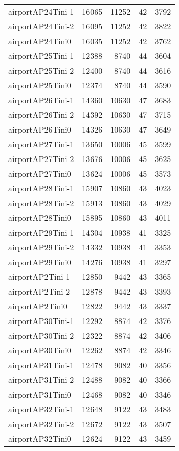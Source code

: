 \begin{tabular}{lrrrr}
airportAP24Tini-1 & 16065 & 11252 & 42 & 3792 \\
airportAP24Tini-2 & 16095 & 11252 & 42 & 3822 \\
airportAP24Tini0 & 16035 & 11252 & 42 & 3762 \\
airportAP25Tini-1 & 12388 & 8740 & 44 & 3604 \\
airportAP25Tini-2 & 12400 & 8740 & 44 & 3616 \\
airportAP25Tini0 & 12374 & 8740 & 44 & 3590 \\
airportAP26Tini-1 & 14360 & 10630 & 47 & 3683 \\
airportAP26Tini-2 & 14392 & 10630 & 47 & 3715 \\
airportAP26Tini0 & 14326 & 10630 & 47 & 3649 \\
airportAP27Tini-1 & 13650 & 10006 & 45 & 3599 \\
airportAP27Tini-2 & 13676 & 10006 & 45 & 3625 \\
airportAP27Tini0 & 13624 & 10006 & 45 & 3573 \\
airportAP28Tini-1 & 15907 & 10860 & 43 & 4023 \\
airportAP28Tini-2 & 15913 & 10860 & 43 & 4029 \\
airportAP28Tini0 & 15895 & 10860 & 43 & 4011 \\
airportAP29Tini-1 & 14304 & 10938 & 41 & 3325 \\
airportAP29Tini-2 & 14332 & 10938 & 41 & 3353 \\
airportAP29Tini0 & 14276 & 10938 & 41 & 3297 \\
airportAP2Tini-1 & 12850 & 9442 & 43 & 3365 \\
airportAP2Tini-2 & 12878 & 9442 & 43 & 3393 \\
airportAP2Tini0 & 12822 & 9442 & 43 & 3337 \\
airportAP30Tini-1 & 12292 & 8874 & 42 & 3376 \\
airportAP30Tini-2 & 12322 & 8874 & 42 & 3406 \\
airportAP30Tini0 & 12262 & 8874 & 42 & 3346 \\
airportAP31Tini-1 & 12478 & 9082 & 40 & 3356 \\
airportAP31Tini-2 & 12488 & 9082 & 40 & 3366 \\
airportAP31Tini0 & 12468 & 9082 & 40 & 3346 \\
airportAP32Tini-1 & 12648 & 9122 & 43 & 3483 \\
airportAP32Tini-2 & 12672 & 9122 & 43 & 3507 \\
airportAP32Tini0 & 12624 & 9122 & 43 & 3459 \\

\end{tabular}
